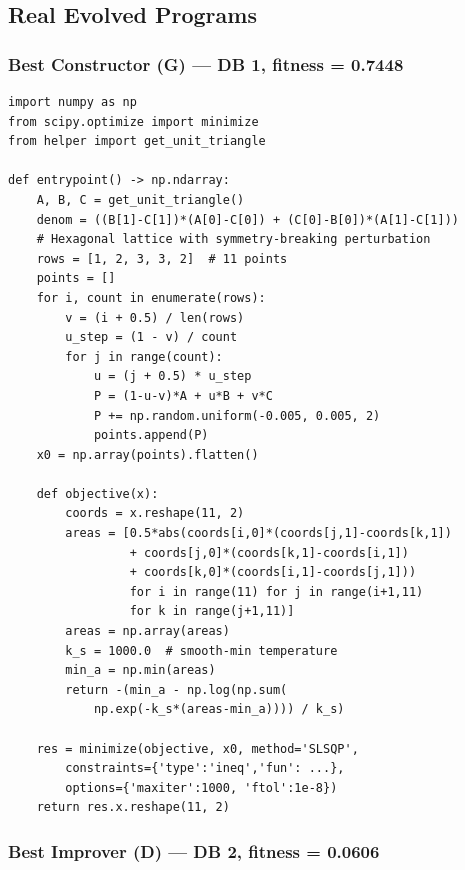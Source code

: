 \documentclass[11pt,a4paper]{article}
\begin{document}
\subsection{Real Evolved Programs}

\subsubsection{Best Constructor (G) --- DB 1, fitness = 0.7448}

\begin{lstlisting}[caption={Evolved Constructor: SLSQP + hexagonal lattice + log-sum-exp smooth-min.}]
import numpy as np
from scipy.optimize import minimize
from helper import get_unit_triangle

def entrypoint() -> np.ndarray:
    A, B, C = get_unit_triangle()
    denom = ((B[1]-C[1])*(A[0]-C[0]) + (C[0]-B[0])*(A[1]-C[1]))
    # Hexagonal lattice with symmetry-breaking perturbation
    rows = [1, 2, 3, 3, 2]  # 11 points
    points = []
    for i, count in enumerate(rows):
        v = (i + 0.5) / len(rows)
        u_step = (1 - v) / count
        for j in range(count):
            u = (j + 0.5) * u_step
            P = (1-u-v)*A + u*B + v*C
            P += np.random.uniform(-0.005, 0.005, 2)
            points.append(P)
    x0 = np.array(points).flatten()

    def objective(x):
        coords = x.reshape(11, 2)
        areas = [0.5*abs(coords[i,0]*(coords[j,1]-coords[k,1])
                 + coords[j,0]*(coords[k,1]-coords[i,1])
                 + coords[k,0]*(coords[i,1]-coords[j,1]))
                 for i in range(11) for j in range(i+1,11)
                 for k in range(j+1,11)]
        areas = np.array(areas)
        k_s = 1000.0  # smooth-min temperature
        min_a = np.min(areas)
        return -(min_a - np.log(np.sum(
            np.exp(-k_s*(areas-min_a)))) / k_s)

    res = minimize(objective, x0, method='SLSQP',
        constraints={'type':'ineq','fun': ...},
        options={'maxiter':1000, 'ftol':1e-8})
    return res.x.reshape(11, 2)
\end{lstlisting}

\subsubsection{Best Improver (D) --- DB 2, fitness = 0.0606}
\end{document}
